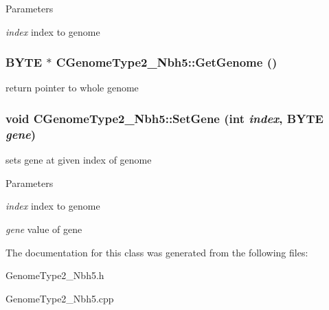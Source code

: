 \begin{DoxyParams}{Parameters}
\item[{\em index}]index to genome \end{DoxyParams}
\hypertarget{classCGenomeType2__Nbh5_af9293f1cd27a74195c9ceeaa8e212d7e}{
\subsubsection[{GetGenome}]{\setlength{\rightskip}{0pt plus 5cm}BYTE $\ast$ CGenomeType2\_\-Nbh5::GetGenome ()}}
\label{classCGenomeType2__Nbh5_af9293f1cd27a74195c9ceeaa8e212d7e}
return pointer to whole genome \hypertarget{classCGenomeType2__Nbh5_aa320d2a086b02a7a76f4701d344b5ddf}{
\subsubsection[{SetGene}]{\setlength{\rightskip}{0pt plus 5cm}void CGenomeType2\_\-Nbh5::SetGene (int {\em index}, \/  BYTE {\em gene})}}
\label{classCGenomeType2__Nbh5_aa320d2a086b02a7a76f4701d344b5ddf}
sets gene at given index of genome


\begin{DoxyParams}{Parameters}
\item[{\em index}]index to genome \item[{\em gene}]value of gene \end{DoxyParams}


The documentation for this class was generated from the following files:\begin{DoxyCompactItemize}
\item 
GenomeType2\_\-Nbh5.h\item 
GenomeType2\_\-Nbh5.cpp\end{DoxyCompactItemize}
